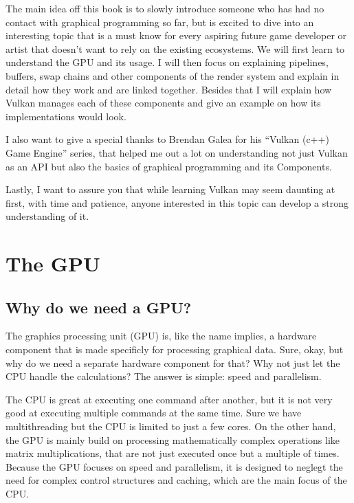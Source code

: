\documentclass[12pt]{report} \usepackage {preamble}
\begin{document}
The main idea off this book is to slowly introduce someone who has had
no contact with graphical programming so far, but is excited to dive
into an interesting topic that is a must know for every aspiring future
game developer or artist that doesn’t want to rely on the existing
ecosystems. We will first learn to understand the GPU and its usage. I
will then focus on explaining pipelines, buffers, swap chains and other
components of the render system and explain in detail how they work
and are linked together. Besides that I will explain how Vulkan manages
each of these components and give an example on how its implementations
would look.

I also want to give a special thanks to Brendan Galea for his “Vulkan
(c++) Game Engine” series, that helped me out a lot on understanding
not just Vulkan as an API but also the basics of graphical programming
and its Components.

Lastly, I want to assure you that while learning Vulkan may seem daunting
at first, with time and patience, anyone interested in this topic can
develop a strong understanding of it.

\chapter {The GPU}

\section {Why do we need a GPU?}

The graphics processing unit (GPU) is, like the name implies, a hardware
component that is made specificly for processing graphical data. Sure,
okay, but why do we need a separate hardware component for that?  Why not
just let the CPU handle the calculations? The answer is simple: speed
and parallelism.

The CPU is great at executing one command after another, but
it is not very good at executing multiple commands at the same
time. Sure we have multithreading but the CPU is limited to just a
few cores. \cite{CDW-cpu_vs_gpu} On the other hand, the GPU is mainly
build on processing mathematically complex operations like matrix
multiplications, that are not just executed once but a multiple
of times. \cite{NVIDIA-cpu-gpu} Because the GPU focuses on speed
and parallelism, it is designed to neglegt the need for complex
control structures and caching, which are the main focus of the
CPU. \cite{CUDA_Programming_Guide}
\end{document}
